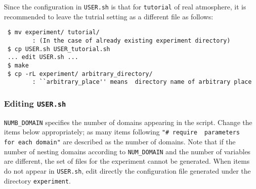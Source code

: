 Since the configuration in \verb|USER.sh| is that for \verb|tutorial| of real atmosphere,
it is recommended to leave the tutrial setting as a different file as follows: 
\begin{verbatim}
 $ mv experiment/ tutorial/    
        : (In the case of already existing experiment directory)
 $ cp USER.sh USER_tutorial.sh
 ... edit USER.sh ...
 $ make
 $ cp -rL experiment/ arbitrary_directory/
        : ``arbitrary_place'' means  directory name of arbitrary place
\end{verbatim}


\subsubsection{Editing \texttt{USER.sh}}

\verb|NUMB_DOMAIN| specifies the number of domains appearing in the script. Change the items below appropriately; as many items following \verb|"# require  parameters for each domain"|  are described as the number of domains. Note that if the number of nesting domains according to \verb|NUM_DOMAIN| and the number of variables are different, the set of files for the experiment cannot be generated. When items do not appear in \verb|USER.sh|, edit directly the configuration file generated under the directory \verb|experiment|.
